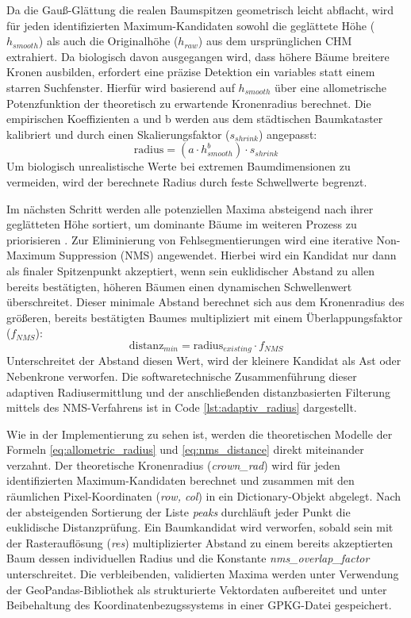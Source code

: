 Da die Gauß-Glättung die realen Baumspitzen geometrisch leicht abflacht, wird für jeden identifizierten Maximum-Kandidaten sowohl die geglättete Höhe ($h_{smooth}$) als auch die Originalhöhe ($h_{raw}$) aus dem ursprünglichen CHM extrahiert. Da biologisch davon ausgegangen wird, dass höhere Bäume breitere Kronen ausbilden, erfordert eine präzise Detektion ein variables statt einem starren Suchfenster. Hierfür wird basierend auf $h_{smooth}$ über eine allometrische Potenzfunktion der theoretisch zu erwartende Kronenradius berechnet. Die empirischen Koeffizienten a und b werden aus dem städtischen Baumkataster kalibriert und durch einen Skalierungsfaktor ($s_{shrink}$) angepasst:
\begin{equation}
    \text{radius} = (a \cdot h_{smooth}^b) \cdot s_{shrink}
    \label{eq:allometric_radius}
\end{equation}
Um biologisch unrealistische Werte bei extremen Baumdimensionen zu vermeiden, wird der berechnete Radius durch feste Schwellwerte begrenzt. 

Im nächsten Schritt werden alle potenziellen Maxima absteigend nach ihrer geglätteten Höhe sortiert, um dominante Bäume im weiteren Prozess zu priorisieren \cite{fuIndividualTreeSegmentationUAV2024}. Zur Eliminierung von Fehlsegmentierungen wird eine iterative Non-Maximum Suppression (\ac{NMS}) angewendet. Hierbei wird ein Kandidat nur dann als finaler Spitzenpunkt akzeptiert, wenn sein euklidischer Abstand zu allen bereits bestätigten, höheren Bäumen einen dynamischen Schwellenwert überschreitet. Dieser minimale Abstand berechnet sich aus dem Kronenradius des größeren, bereits bestätigten Baumes multipliziert mit einem Überlappungsfaktor ($f_{NMS}$):
\begin{equation}
    \text{distanz}_{min} = \text{radius}_{existing} \cdot f_{NMS}
    \label{eq:nms_distance}
\end{equation}
Unterschreitet der Abstand diesen Wert, wird der kleinere Kandidat als Ast oder Nebenkrone verworfen. \cite{yuIndividualTreeSegmentation2024} Die softwaretechnische Zusammenführung dieser adaptiven Radiusermittlung und der anschließenden distanzbasierten Filterung mittels des NMS-Verfahrens ist in Code \ref{lst:adaptiv_radius} dargestellt.



Wie in der Implementierung zu sehen ist, werden die theoretischen Modelle der Formeln \ref{eq:allometric_radius} und \ref{eq:nms_distance} direkt miteinander verzahnt. Der theoretische Kronenradius (\textit{crown\_rad}) wird für jeden identifizierten Maximum-Kandidaten berechnet und zusammen mit den räumlichen Pixel-Koordinaten (\textit{row, col}) in ein Dictionary-Objekt abgelegt. Nach der absteigenden Sortierung der Liste \textit{peaks} durchläuft jeder Punkt die euklidische Distanzprüfung. Ein Baumkandidat wird verworfen, sobald sein mit der Rasterauflösung (\textit{res}) multiplizierter Abstand zu einem bereits akzeptierten Baum dessen individuellen Radius und die Konstante \textit{nms\_overlap\_factor} unterschreitet. Die verbleibenden, validierten Maxima werden unter Verwendung der GeoPandas-Bibliothek als strukturierte Vektordaten aufbereitet und unter Beibehaltung des Koordinatenbezugssystems in einer GPKG-Datei gespeichert.